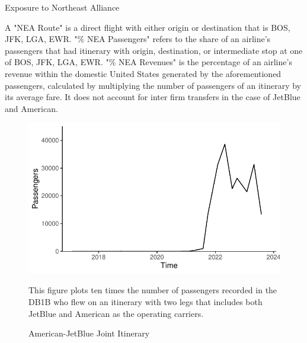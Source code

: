 \documentclass{article}
\begin{document}
\begin{appendices}
	\begin{landscape}
		\begin{table}
			\caption{Exposure to Northeast Alliance}
			\label{tab:NEA_Exposure}
			
			\begin{minipage}{1.75\textwidth} %
				{\footnotesize A "NEA Route" is a direct flight with either origin or destination that is BOS, JFK, LGA, EWR. "\% NEA Passengers" refers to the share of an airline's passengers that had itinerary with origin, destination, or intermediate stop at one of BOS, JFK, LGA, EWR. "\% NEA Revenues"  is the percentage of an airline's revenue within the domestic United States generated by the aforementioned passengers, calculated by multiplying the number of passengers of an itinerary by its average fare. It does not account for inter firm transfers in the case of JetBlue and American.}
			\end{minipage}
		\end{table}
	\end{landscape}
	
		\begin{figure}
		\caption{American-JetBlue Joint Itinerary}
		\label{fig:NEA_Joint_Op}
		\includegraphics[width = \linewidth]{NEA_OPCarrier_Switch_Graph}
		\begin{minipage}{\textwidth} %
			{\footnotesize This figure plots ten times the number of passengers recorded in the DB1B who flew on an itinerary with two legs that includes both JetBlue and American as the operating carriers.}
		\end{minipage}
	\end{figure}
	

\end{appendices}
\end{document}
